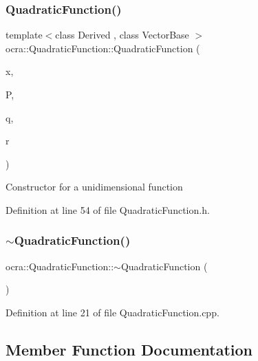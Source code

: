 \subsubsection{\texorpdfstring{Quadratic\+Function()}{QuadraticFunction()}\hspace{0.1cm}{\footnotesize\ttfamily [2/2]}}
{\footnotesize\ttfamily template$<$class Derived , class Vector\+Base $>$ \\
ocra\+::\+Quadratic\+Function\+::\+Quadratic\+Function (\begin{DoxyParamCaption}\item[{\hyperlink{classocra_1_1Variable}{Variable} \&}]{x,  }\item[{const Matrix\+Base$<$ Derived $>$ \&}]{P,  }\item[{const Vector\+Base \&}]{q,  }\item[{double}]{r }\end{DoxyParamCaption})\hspace{0.3cm}{\ttfamily [inline]}}

Constructor for a unidimensional function 

Definition at line 54 of file Quadratic\+Function.\+h.

\hypertarget{classocra_1_1QuadraticFunction_a84bd0afec5679c1620170a97fd1be648}{}\label{classocra_1_1QuadraticFunction_a84bd0afec5679c1620170a97fd1be648} 
\subsubsection{\texorpdfstring{$\sim$\+Quadratic\+Function()}{~QuadraticFunction()}}
{\footnotesize\ttfamily ocra\+::\+Quadratic\+Function\+::$\sim$\+Quadratic\+Function (\begin{DoxyParamCaption}{ }\end{DoxyParamCaption})\hspace{0.3cm}{\ttfamily [virtual]}}



Definition at line 21 of file Quadratic\+Function.\+cpp.



\subsection{Member Function Documentation}
\hypertarget{classocra_1_1QuadraticFunction_ab2a6c4e433226c423f7a3dff95f68998}{}\label{classocra_1_1QuadraticFunction_ab2a6c4e433226c423f7a3dff95f68998} 
